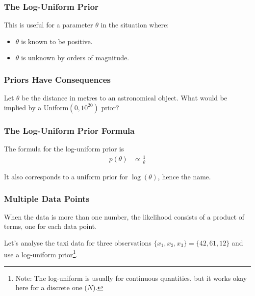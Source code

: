 \documentclass{beamer}
\begin{document}
\begin{frame}
\frametitle{The Log-Uniform Prior}
This is useful for a parameter $\theta$ in the situation where:

\begin{itemize}
\item $\theta$ is known to be positive.\pause
\item $\theta$ is unknown by orders of magnitude.\pause
\end{itemize}
\vspace{0.5em}

\end{frame}

\begin{frame}
\frametitle{Priors Have Consequences}
Let $\theta$ be the distance in metres to an astronomical
object. What would be implied by a Uniform$(0, 10^{20})$ prior?

\end{frame}



\begin{frame}[fragile]
\frametitle{The Log-Uniform Prior Formula}

The formula for the log-uniform prior is
\begin{align}
p(\theta) &\propto \frac{1}{\theta}
\end{align}

It also corresponds to a uniform prior for $\log(\theta)$,
hence the name.

\end{frame}



\begin{frame}[fragile]
\frametitle{Multiple Data Points}
When the data is more than one number, the likelihood consists
of a product of terms, one for each data point.

Let's analyse the taxi data for three observations
$\{x_1, x_2, x_3\} = \{42, 61, 12\}$ and use a log-uniform
prior\footnote{Note: The log-uniform is usually for
continuous quantities, but it works okay here for a discrete
one ($N$).}.

\end{frame}
\end{document}

